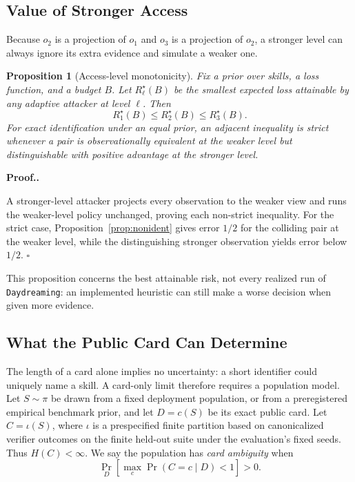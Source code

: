 \documentclass[letterpaper,twocolumn,10pt]{article}
\newcommand{\method}{\texttt{Daydreaming}\xspace}
\newtheorem{proposition}{Proposition}[section]
\newcommand{\paragraphtitle}[1]{%
  \vspace{5pt}\noindent\textbf{#1.}%
}
\begin{document}
\subsection{Value of Stronger Access}

Because $o_2$ is a projection of $o_1$ and $o_3$ is a projection of $o_2$, a
stronger level can always ignore its extra evidence and simulate a weaker one.

\begin{proposition}[Access-level monotonicity]
\label{prop:access-monotonicity}
Fix a prior over skills, a loss function, and a budget $B$.  Let
$R_\ell^\star(B)$ be the smallest expected loss attainable by any adaptive
attacker at level $\ell$.  Then
\[
  R_1^\star(B)\le R_2^\star(B)\le R_3^\star(B).
\]
For exact identification under an equal prior, an adjacent inequality is strict
whenever a pair is observationally equivalent at the weaker level but
distinguishable with positive advantage at the stronger level.
\end{proposition}

\paragraphtitle{Proof.}
A stronger-level attacker projects every observation to the weaker view and
runs the weaker-level policy unchanged, proving each non-strict inequality.  For
the strict case, Proposition~\ref{prop:nonident} gives error $1/2$ for the
colliding pair at the weaker level, while the distinguishing stronger
observation yields error below $1/2$.  \hfill$\square$

This proposition concerns the best attainable risk, not every realized run of
\method: an implemented heuristic can still make a worse decision when given
more evidence.

\subsection{What the Public Card Can Determine}

The length of a card alone implies no uncertainty: a short identifier could
uniquely name a skill.  A card-only limit therefore requires a population model.
Let $S\sim\pi$ be drawn from a fixed deployment population, or from a
preregistered empirical benchmark prior, and let $D=c(S)$ be its exact public
card.  Let $C=\iota(S)$, where $\iota$ is a prespecified finite partition based
on canonicalized verifier outcomes on the finite held-out suite under the
evaluation's fixed seeds.  Thus $H(C)<\infty$.  We say the population has
\emph{card ambiguity} when
\begin{equation}
  \Pr_D\!\left[\max_c\Pr(C=c\mid D)<1\right]>0.
  \label{eq:card-ambiguity}
\end{equation}
\end{document}
